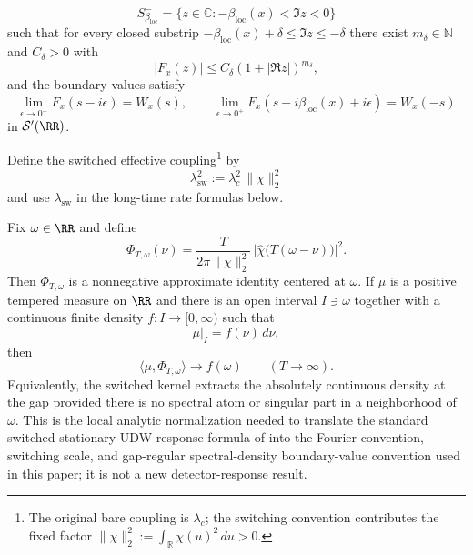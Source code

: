 \begin{assumption}
\begin{enumerate}[label=\textup{(\roman*)},leftmargin=2.2em,itemsep=0.25em]
\[
S_{\beta_{\mathrm{loc}}}^-=\{z\in\mathbb C:-\beta_{\mathrm{loc}}(x)<\Im z<0\}
\]
such that for every closed substrip $-\beta_{\mathrm{loc}}(x)+\delta\le \Im z\le -\delta$ there exist $m_\delta\in\mathbb N$ and $C_\delta>0$ with
\[
|F_x(z)|\le C_\delta(1+|\Re z|)^{m_\delta},
\]
and the boundary values satisfy
\[
\lim_{\epsilon\to0^+}F_x(s-i\epsilon)=W_x(s),\qquad
\lim_{\epsilon\to0^+}F_x(s-i\beta_{\mathrm{loc}}(x)+i\epsilon)=W_x(-s)
\]
in $\mathcal S'(\RR)$.
\end{enumerate}
Define the switched effective coupling\footnote{The original bare coupling is $\lambda_c$; the switching convention contributes the fixed factor $\|\chi\|_2^2:=\int_{\mathbb R}\chi(u)^2\,du>0$.} by
\[
\lambda_{\mathrm{sw}}^2:=\lambda_c^2\,\|\chi\|_2^2
\]
and use $\lambda_{\mathrm{sw}}$ in the long-time rate formulas below.
\end{assumption}

\begin{lemma}\label{lem:gap-regular-approx-identity-main}
Fix $\omega\in\RR$ and define
\begin{equation}\label{eq:approx-identity-main}
\Phi_{T,\omega}(\nu)=
\frac{T}{2\pi\|\chi\|_2^2}\,
\bigl|\widehat\chi\bigl(T(\omega-\nu)\bigr)\bigr|^2 .
\end{equation}
Then $\Phi_{T,\omega}$ is a nonnegative approximate identity centered at
$\omega$. If $\mu$ is a positive tempered measure on $\RR$ and there is an open
interval $I\ni\omega$ together with a continuous finite density $f:I\to[0,\infty)$
such that
\[
\mu|_I=f(\nu)\,d\nu,
\]
then
\[
\langle \mu,\Phi_{T,\omega}\rangle\longrightarrow f(\omega)
\qquad (T\to\infty).
\]
Equivalently, the switched kernel extracts the absolutely continuous density at
the gap provided there is no spectral atom or singular part in a neighborhood of
$\omega$. This is the local analytic normalization needed to translate the
standard switched stationary UDW response formula of
\cite[Sec.~II]{LoukoSatz2008} into the Fourier convention, switching scale, and
gap-regular spectral-density boundary-value convention used in this paper; it
is not a new detector-response result.
\end{lemma}

